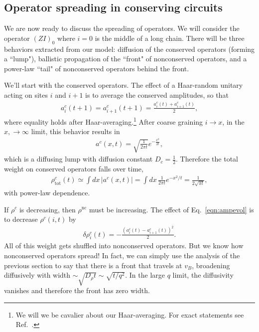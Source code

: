 \documentclass[a4paper,12pt]{article}
\renewcommand{\th}[1]{\frac{1}{#1}}
\newcommand{\abs}[1]{\left| #1 \right|}
\newcommand{\nc}{\text{nc}}
\newcommand{\tot}{\text{tot}}
\begin{document}
\subsection{Operator spreading in conserving circuits} \label{sub:consop}

We are now ready to discuss the spreading of operators. We will consider the operator $(ZI)_0$ where $i=0$ is the middle of a long chain. There will be three behaviors extracted from our model: diffusion of the conserved operators (forming a ``lump"), ballistic propagation of the ``front" of nonconserved operators, and a power-law ``tail" of nonconserved operators behind the front.

We'll start with the conserved operators. The effect of a Haar-random unitary acting on sites $i$ and $i+1$ is to average the conserved amplitudes, so that
\begin{align}
a^c_i(t+1)=a^c_{i+1}(t+1) = \frac{a^c_i(t)+a^c_{i+1}(t)}{2}, \label{eqn:ampevol}
\end{align}
where equality holds after Haar-averaging.\footnote{We will we be cavalier about our Haar-averaging. For exact statements see Ref.~\cite{KhemaniOpSp}.} After coarse graining $i\to x$, in the $x, \to\infty$ limit, this behavior results in 
\begin{align}
a^c(x,t) = \sqrt{\frac{1}{2\pi t}}e^{-\frac{x^2}{2t}},
\end{align}
which is a diffusing lump with diffusion constant $D_c=\th{2}$. Therefore the total weight on conserved operators falls over time,
\begin{align}
\rho^c_\tot(t) \simeq \int dx\,\abs{a^c(x,t)} = \int dx\,\th{2\pi t}e^{-x^2/t} 
	=\th{2\sqrt{\pi t}},
\end{align}
with power-law dependence.

If $\rho^c$ is decreasing, then $\rho^\nc$ must be increasing. The effect of Eq.~\ref{eqn:ampevol} is to decrease $\rho^c(i,t)$ by
\begin{align}
\delta \rho^c_i(t) = -\frac{(a^c_i(t)-a^c_{i+1}(t))^2}{2}.
\end{align}
All of this weight gets shuffled into nonconserved operators. But we know how nonconserved operators spread! In fact, we can simply use the analysis of the previous section to say that there is a front that travels at $v_B$, broadening diffusively with width $\sim\sqrt{D_\rho t}\sim\sqrt{t/q^2}$. In the large $q$ limit, the diffusivity vanishes and therefore the front has zero width.
\end{document}
